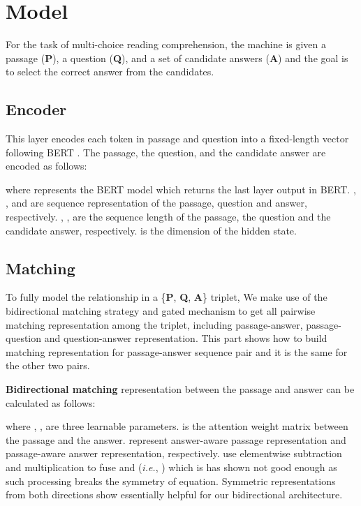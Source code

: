 \documentclass[11pt,a4paper]{article}
\begin{document}
	\section{Model}
	
	For the task of multi-choice reading comprehension, the machine is given a passage (\textbf{P}), a question (\textbf{Q}), and a set of candidate answers (\textbf{A}) and the goal is to select the correct answer from the candidates. 
	
	\subsection{Encoder} \label{Encoding} 
	This layer encodes each token in passage and question into a fixed-length vector following BERT \cite{Devlin-18}. The passage, the question, and the candidate answer are encoded as follows:
	
	where  represents the BERT model which returns the last layer output in BERT. , , and  are sequence representation of the passage, question and answer, respectively.
	, ,  are the sequence length of the passage, the question and the candidate answer, respectively.  is the dimension of the hidden state.
	
	\subsection{Matching} \label{Matching} 
	
	To fully model the relationship in a \{\textbf{P}, \textbf{Q}, \textbf{A}\} triplet, We make use of the bidirectional matching strategy and gated mechanism to get all pairwise matching representation among the triplet, including passage-answer, passage-question and question-answer representation. This part shows how to build matching representation for passage-answer sequence pair and it is the same for the other two pairs.
	
	\textbf{Bidirectional matching} representation between the passage  and answer  can be calculated as follows:
	
	where , ,  are three learnable parameters.  is the attention weight matrix between the passage and the answer.  represent answer-aware passage representation and passage-aware answer representation, respectively. \cite{Wang-2018, tang2019multi} use elementwise subtraction and multiplication to fuse  and  (\emph{i.e.}, ) which is has shown not good enough as such processing breaks the symmetry of equation. Symmetric representations from both directions show essentially helpful for our bidirectional architecture.
	
\end{document}
